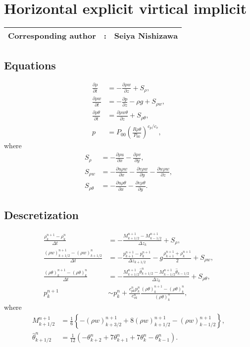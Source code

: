 \chapter{Horizontal explicit virtical implicit}
\label{chap:hevi}
{\bf \Large 
\begin{tabular}{ccc}
\hline
  Corresponding author & : & Seiya Nishizawa\\
\hline
\end{tabular}
}

\section{Equations}

\begin{align}
  \frac{\partial \rho}{\partial t}
  &= -\frac{\partial \rho w}{\partial z} + S_\rho, \\
  \frac{\partial \rho w}{\partial t}
  &= -\frac{\partial p}{\partial z} -\rho g + S_{\rho w}, \\
  \frac{\partial \rho\theta}{\partial t}
  &= \frac{\partial \rho w\theta}{\partial z} + S_{\rho\theta}, \\
  p &= P_{00}\left(\frac{R\rho\theta}{P_{00}}\right)^{c_p/c_v},
\end{align}
where
\begin{align}
  S_\rho &= - \frac{\partial \rho u}{\partial x}
           - \frac{\partial \rho v}{\partial y}, \\
  S_{\rho w} &= - \frac{\partial u\rho w}{\partial x}
              - \frac{\partial v\rho w}{\partial y}
              - \frac{\partial w\rho w}{\partial z}, \\
  S_{\rho\theta} &= - \frac{\partial u\rho\theta}{\partial x}
                 - \frac{\partial v\rho\theta}{\partial y}.
\end{align}

\section{Descretization}
\begin{align}
  \frac{\rho_k^{n+1}-\rho_k^n}{\Delta t}
  &= -\frac{M_{k+1/2}^{n+1}-M_{k-1/2}^{n+1}}{\Delta z_k} + S_\rho, \\
  \frac{(\rho w)_{k+1/2}^{n+1}-(\rho w)_{k+1/2}^n}{\Delta t}
  &= -\frac{p_{k+1}^{n+1}-p_k^{n+1}}{\Delta z_{k+1/2}} -g\frac{\rho_{k+1}^{n+1}+\rho_k^{n+1}}{2} + S_{\rho w}, \\
  \frac{(\rho\theta)_k^{n+1}-(\rho\theta)_k^n}{\Delta t}
  &= -\frac{M_{k+1/2}^{n+1}\hat{\theta}_{k+1/2}^n-M_{k-1/2}^{n+1}\hat{\theta}_{k-1/2}}{\Delta z_k} + S_{\rho\theta}, \\
  p_k^{n+1} &\sim p_k^n + \frac{c_{p k}^np_k^n}{c_{v k}^n}\frac{(\rho\theta)_k^{n+1}-(\rho\theta)_k^n}{(\rho\theta)_k^n},
\end{align}
where
\begin{align}
  M_{k+1/2}^{n+1}
  &= \frac{1}{6}\left\{-(\rho w)_{k+3/2}^{n+1}+8(\rho w)_{k+1/2}^{n+1}-(\rho w)_{k-1/2}^{n+1}\right\}, \\
  \hat{\theta}_{k+1/2}^n
  &= \frac{1}{12}(-\theta_{k+2}^n+7\theta_{k+1}^n+7\theta_k^n-\theta_{k-1}^n).
\end{align}

